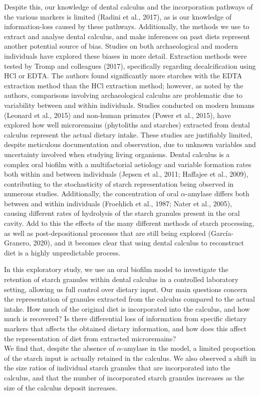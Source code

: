 \documentclass[utf8]{frontiers/frontiersSCNS}
\begin{document}
Despite this, our knowledge of dental calculus and the incorporation pathways of
the various markers is limited (Radini et al., 2017), as is our
knowledge of information-loss caused by these pathways. Additionally, the methods
we use to extract and analyse dental calculus, and make inferences on past diets
represent another potential source of bias. Studies on both archaeological and
modern individuals have explored these biases in more detail.
Extraction methods were tested
by Tromp and colleagues (2017), specifically regarding
decalcification using HCl or EDTA.
The authors found significantly more starches with the EDTA extraction method
than the HCl extraction method; however, as noted by the authors, comparisons
involving archaeological calculus are problematic due to variability between and
within individuals.
Studies conducted on modern humans (Leonard et al., 2015)
and non-human primates (Power et al., 2015),
have explored how well microremains (phytoliths and starches)
extracted from dental calculus represent the actual dietary intake.
These studies are justifiably limited,
despite meticulous documentation and observation, due to unknown variables and
uncertainty involved when studying living organisms. Dental calculus is a complex
oral biofilm with a multifactorial aetiology and variable formation rates both
within and between individuals (Jepsen et al., 2011; Haffajee et al., 2009),
contributing to
the stochasticity of starch representation being observed in numerous studies.
Additionally, the concentration of oral \(\alpha\)-amylase differs both between and
within individuals (Froehlich et al., 1987; Nater et al., 2005),
causing different rates of hydrolysis of the starch granules present in the oral
cavity. Add to this the effects of the many different methods
of starch processing, as well as post-depositional processes that are still being
explored (García-Granero, 2020), and it becomes clear that using
dental calculus to reconstruct diet is a highly unpredictable process.

In this exploratory study, we use an oral biofilm model to investigate the
retention of starch granules within dental calculus in a controlled laboratory
setting, allowing us full control over dietary input. Our main questions concern
the representation of granules extracted
from the calculus compared to the actual intake. How much of the original diet is
incorporated into the calculus, and how much is recovered?
Is there differential loss of information from specific dietary markers that affects
the obtained dietary information, and how does this affect the representation of
diet from extracted microremains?\\
We find that, despite the absence of \(\alpha\)-amylase in
the model, a limited proportion of the starch input is actually
retained in the calculus. We also observed a shift in the size ratios of individual
starch granules that are incorporated into the calculus, and that the number of
incorporated starch granules increases as the size of the calculus deposit
increases.
\end{document}
